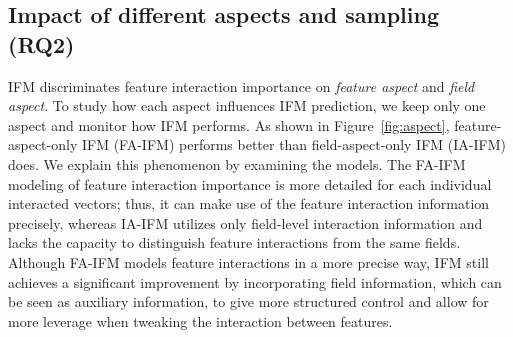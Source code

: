 \documentclass[letterpaper]{article} \usepackage{aaai19}  \usepackage{times}  \usepackage{helvet}  \usepackage{courier}  \usepackage{url}  \usepackage{graphicx}  \frenchspacing  \setlength{\pdfpagewidth}{8.5in}  \setlength{\pdfpageheight}{11in}  \usepackage{mathtools}
\begin{document}
\begin{table}[t]
\caption{Test RMSE from different models.} \label{table:model_performance}
\begin{center}
\begin{small} 
\begin{sc} 
 \end{sc} \end{small} \end{center} \end{table} 


\subsection{Impact of different aspects and sampling (\textbf{RQ2})} \label{sec:aspect}
IFM discriminates feature interaction importance on \emph{feature aspect} and \emph{field aspect}. To study how each aspect influences IFM prediction, we keep only one aspect and monitor how IFM performs. As shown in Figure~\ref{fig:aspect}, feature-aspect-only IFM (FA-IFM) performs better than field-aspect-only IFM (IA-IFM) does. We explain this phenomenon by examining the models. The FA-IFM modeling of feature interaction importance is more detailed for each individual interacted vectors; thus, it can make use of the feature interaction information precisely, whereas IA-IFM utilizes only field-level interaction information and lacks the capacity to distinguish feature interactions from the same fields.
Although FA-IFM models feature interactions in a more precise way, IFM still achieves a significant improvement by incorporating field information, which can be seen as auxiliary information, to give more structured control and allow for more leverage when tweaking the interaction between features.
\end{document}
